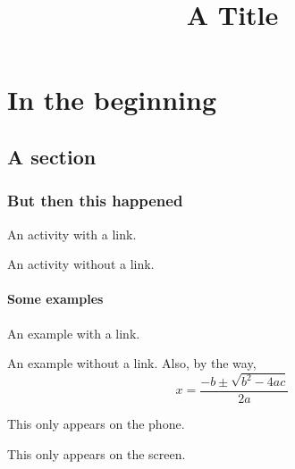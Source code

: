 \documentclass[screen]{screendoc}
\title{A Title}
\begin{document}
    \maketitle
    \chapter{In the beginning}
    \section{A section}
    \blindtext
    \subsection*{But then this happened}
    \blindtext

    \begin{activity}
        An activity with a link.
    \end{activity}

    \begin{activity}
        An activity without a link. 
    \end{activity}

    \subsubsection*{Some examples}
    \blindtext

    \begin{example}
        An example with a link. 
    \end{example}

    \begin{example}
        An example without a link. Also, by the way, 
        \[ x = \frac{-b \pm \sqrt{b^2 - 4ac}}{2a} \]
    \end{example}
    

    \begin{onphone}
        This only appears on the phone.
    \end{onphone}

    \begin{onscreen}
        This only appears on the screen. 
    \end{onscreen}

    \blindtext[10][12]
\end{document}
